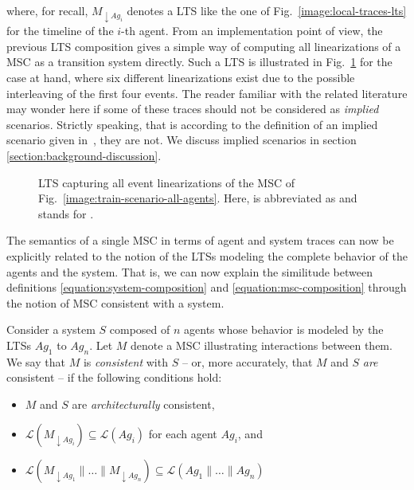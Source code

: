\noindent where, for recall, $M_{\downarrow Ag_i}$ denotes a LTS like the one of Fig.~\ref{image:local-traces-lts} for the timeline of the $i$-th agent. From an implementation point of view, the previous LTS composition gives a simple way of computing all linearizations of a MSC as a transition system directly. Such a LTS is illustrated in Fig.~\ref{image:msc-linearizations} for the case at hand, where six different linearizations exist due to the possible interleaving of the first four events. The reader familiar with the related literature may wonder here if some of these traces should not be considered as \emph{implied} scenarios. Strictly speaking, that is according to the definition of an implied scenario given in~\cite{Uchitel:2004}, they are not. We discuss implied scenarios in section \ref{section:background-discussion}.

\vspace{0.5cm}
\begin{figure}[H]\centering
{}
\caption{LTS capturing all event linearizations of the MSC of Fig.~\ref{image:train-scenario-all-agents}. Here,  is abbreviated as  and  stands for . \label{image:msc-linearizations}}
\end{figure}

The semantics of a single MSC in terms of agent and system traces can now be explicitly related to the notion of the LTSs modeling the complete behavior of the agents and the system. That is, we can now explain the similitude between definitions \ref{equation:system-composition} and \ref{equation:msc-composition} through the notion of MSC consistent with a system. 

Consider a system $S$ composed of $n$ agents whose behavior is modeled by the LTSs $Ag_1$ to $Ag_n$. Let $M$ denote a MSC illustrating interactions between them. We say that $M$ is \emph{consistent} with $S$ -- or, more accurately, that $M$ and $S$ \emph{are} consistent -- if the following conditions hold:

\begin{itemize}
\item $M$ and $S$ are \emph{architecturally} consistent,
\item $\mathcal{L}(M_{\downarrow Ag_i}) \subseteq \mathcal{L}(Ag_i)$ for each agent $Ag_i$, and
\item $\mathcal{L}(M_{\downarrow Ag_1} \parallel \ldots \parallel M_{\downarrow Ag_n}) \subseteq \mathcal{L}(Ag_1 \parallel \ldots \parallel Ag_n)$
\end{itemize}

